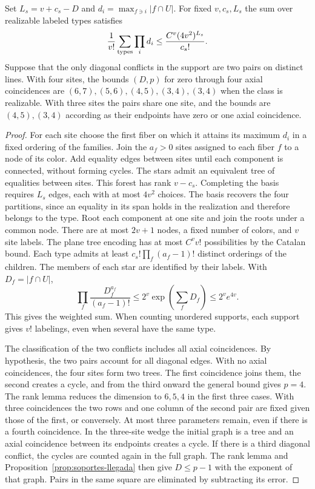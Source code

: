 \begin{lema}\label{lem:tipos-llegada}
Set \(L_s=v+c_s-D\) and \(d_i=\max_{f\ni i}|f\cap U|\). For fixed \(v,c_s,L_s\) the sum over realizable
labeled types satisfies
\[
 \frac1{v!}\sum_{\rm types}\prod_i d_i\le \frac{C^v(4v^2)^{L_s}}{c_s!}.
\]
Suppose that the only diagonal conflicts in the support are two pairs on distinct lines. With four sites,
the bounds \((D,p)\) for zero through four axial coincidences are \((6,7),(5,6),(4,5),(3,4),(3,4)\) when
the class is realizable. With three sites the pairs share one site, and the bounds are \((4,5),(3,4)\)
according as their endpoints have zero or one axial coincidence.
\end{lema}
\begin{proof}
For each site choose the first fiber on which it attains its maximum \(d_i\) in a fixed ordering of the
families. Join the \(a_f>0\) sites assigned to each fiber \(f\) to a node of its color. Add equality
edges between sites until each component is connected, without forming cycles. The stars admit an
equivalent tree of equalities between sites. This forest has rank \(v-c_s\). Completing the basis
requires \(L_s\) edges, each with at most \(4v^2\) choices. The basis recovers the four partitions, since
an equality in its span holds in the realization and therefore belongs to the type. Root each component
at one site and join the roots under a common node. There are at most \(2v+1\) nodes, a fixed number of
colors, and \(v\) site labels. The plane tree encoding has at most \(C^v v!\) possibilities by the
Catalan bound. Each type admits at least \(c_s!\prod_f(a_f-1)!\) distinct orderings of the children. The
members of each star are identified by their labels. With \(D_f=|f\cap U|\),
\[
 \prod_f\frac{D_f^{a_f}}{(a_f-1)!}\le 2^v\exp\!\left(\sum_fD_f\right)
 \le 2^ve^{4v}.
\]
This gives the weighted sum. When counting unordered supports, each support gives \(v!\) labelings, even
when several have the same type.

The classification of the two conflicts includes all axial coincidences. By hypothesis, the two pairs
account for all diagonal edges. With no axial coincidences, the four sites form two trees. The first
coincidence joins them, the second creates a cycle, and from the third onward the general bound gives
\(p=4\). The rank lemma reduces the dimension to \(6,5,4\) in the first three cases. With three
coincidences the two rows and one column of the second pair are fixed given those of the first, or
conversely. At most three parameters remain, even if there is a fourth coincidence. In the three-site
wedge the initial graph is a tree and an axial coincidence between its endpoints creates a cycle. If
there is a third
diagonal conflict, the cycles are counted again in the full graph. The rank lemma and
Proposition~\ref{prop:soportes-llegada} then give \(D\le p-1\) with the exponent of that graph. Pairs in
the same square are eliminated by subtracting its error.
\end{proof}
